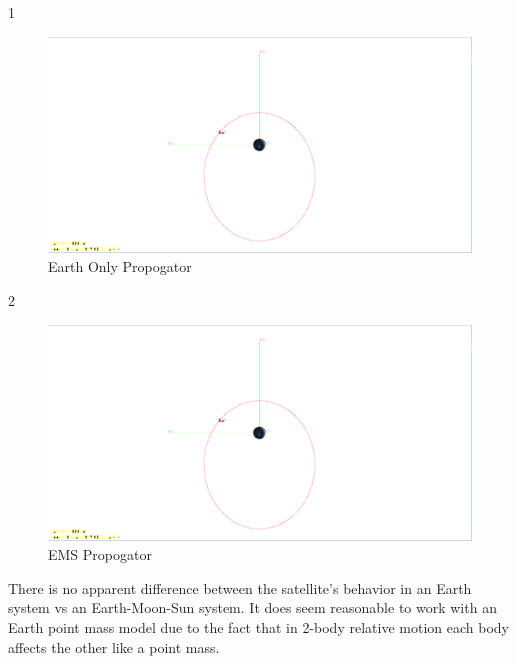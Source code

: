 \documentclass[hidelinks,12pt]{article}
\begin{document}

\flushleft \large 1\\
\begin{figure}[!htb]
  \includegraphics[scale=0.4]{HW4-2}
  \caption{Earth Only Propogator}
  \label{}
\end{figure}

\newpage
\flushleft \large 2\\
\normalsize
\begin{figure}[!htb]
  \includegraphics[scale=0.4]{HW4-2}
  \caption{EMS Propogator}
  \label{}
\end{figure}
There is no apparent difference between the satellite's behavior in an Earth system vs an Earth-Moon-Sun system. It does seem reasonable to work with an Earth point mass model due to the fact that in 2-body relative motion each body affects the other like a point mass.
\end{document}
